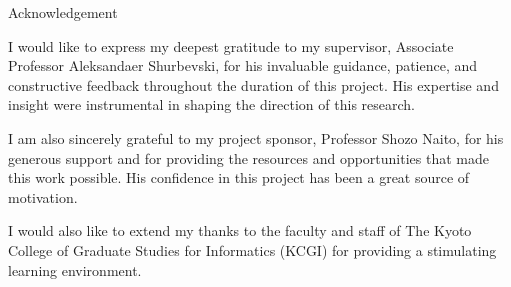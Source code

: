\documentclass[conference]{IEEEtran}
\begin{document}
Acknowledgement

I would like to express my deepest gratitude to my supervisor, Associate Professor Aleksandaer Shurbevski, for his invaluable guidance, patience, and constructive feedback throughout the duration of this project. His expertise and insight were instrumental in shaping the direction of this research.

I am also sincerely grateful to my project sponsor, Professor Shozo Naito, for his generous support and for providing the resources and opportunities that made this work possible. His confidence in this project has been a great source of motivation.

I would also like to extend my thanks to the faculty and staff of The Kyoto College of Graduate Studies for Informatics (KCGI) for providing a stimulating learning environment.




\end{document}
